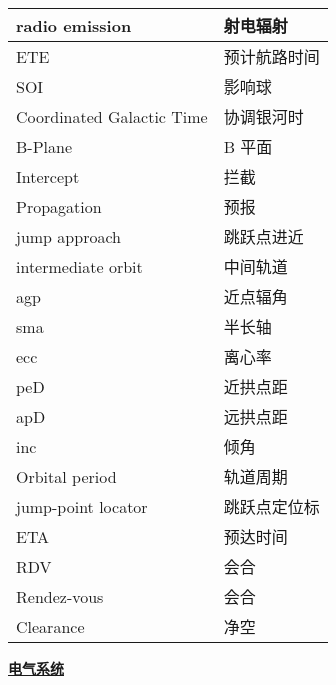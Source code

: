 \documentclass[a4paper]{article}
\theoremstyle{definition}
\begin{document}
{{\begin{longtable}{|p{4.5cm}|p{\textwidth-6.5cm}|}
	radio emission                  & 射电辐射    \\ \hline
	ETE                             & 预计航路时间  \\ \hline
	SOI                             & 影响球     \\ \hline
	Coordinated Galactic Time       & 协调银河时   \\ \hline
	B-Plane                         & B 平面    \\ \hline
	Intercept                       & 拦截      \\ \hline
	Propagation                     & 预报      \\ \hline
	jump approach                   & 跳跃点进近   \\ \hline
	intermediate orbit              & 中间轨道    \\ \hline
	agp                             & 近点辐角    \\ \hline
	sma                             & 半长轴     \\ \hline
	ecc                             & 离心率     \\ \hline
	peD                             & 近拱点距    \\ \hline
	apD                             & 远拱点距    \\ \hline
	inc                             & 倾角      \\ \hline
	Orbital period                  & 轨道周期    \\ \hline
	jump-point locator              & 跳跃点定位标  \\ \hline
	ETA                             & 预达时间    \\ \hline
	RDV                             & 会合      \\ \hline
	Rendez-vous                     & 会合      \\ \hline
	Clearance                       & 净空      \\ \hline
\end{longtable}}}
\newpage










\hspace{-2em}


{\hspace{-1em}\textbf{\uline{电气系统}}}

\end{document}
